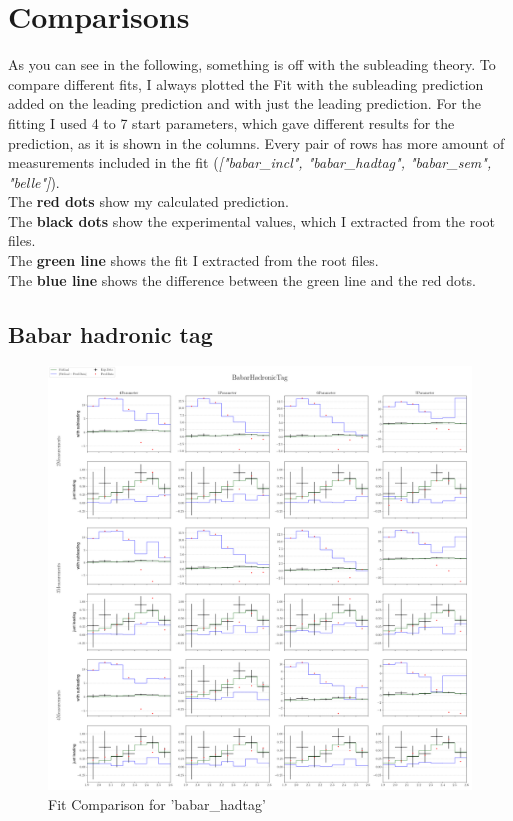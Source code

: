 \documentclass[a4paper,12pt]{article}
\begin{document}
\section{Comparisons}
As you can see in the following, something is off with the subleading theory. To compare different fits, I always plotted the Fit with the subleading prediction added on the leading prediction and with just the leading prediction.
For the fitting I used 4 to 7 start parameters, which gave different results for the prediction, as it is shown in the columns.
Every pair of rows has more amount of measurements included in the fit (\textit{["babar\_incl", "babar\_hadtag", "babar\_sem", "belle"]}).\\
The \textbf{red dots} show my calculated prediction.\\
The \textbf{black dots} show the experimental values, which I extracted from the root files.\\
The \textbf{green line} shows the fit I extracted from the root files.\\
The \textbf{blue line} shows the difference between the green line and the red dots.


\subsection{Babar hadronic tag}
\begin{figure}[H]
    \centering
    \includegraphics[scale=0.3]{../compare/babar_hadtag_soft_compare.png}
    \caption{Fit Comparison for 'babar\_hadtag'}
\end{figure}
\end{document}
